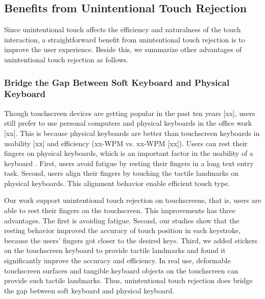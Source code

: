 
\subsection{Benefits from Unintentional Touch Rejection}

Since unintentional touch affects the efficiency and naturalness of the touch interaction, a straightforward benefit from unintentional touch rejection is to improve the user experience. Beside this, we summarize other advantages of unintentional touch rejection as follows.

\subsubsection{Bridge the Gap Between Soft Keyboard and Physical Keyboard}

Though touchscreen devices are getting popular in the past ten years [xx], users still prefer to use personal computers and physical keyboards in the office work [xx]. This is because physical keyboards are better than touchscreen keyboards in usability [xx] and efficiency (xx-WPM vs. xx-WPM [xx]). Users can rest their fingers on physical keyboards, which is an important factor in the usability of a keyboard \cite{2013-TapBoard}. First, users avoid fatigue by resting their fingers in a long text entry task. Second, users align their fingers by touching the tactile landmarks on physical keyboards. This alignment behavior enable efficient touch type.

Our work support unintentional touch rejection on touchscreens, that is, users are able to rest their fingers on the touchscreen. This improvements has three advantages. The first is avoiding fatigue. Second, our studies show that the resting behavior improved the accuracy of touch position in each keystroke, because the users' fingers got closer to the desired keys. Third, we added stickers on the touchscreen keyboard to provide tactile landmarks and found it significantly improve the accuracy and efficiency. In real use, deformable touchscreen surfaces \cite{2011-Stimtac,2010-TeslaTouch,2011-Enhancing} and tangible keyboard objects on the touchscreen \cite{2008-Slap,2020-TouchFire} can provide such tactile landmarks. Thus, unintentional touch rejection does bridge the gap between soft keyboard and physical keyboard.

